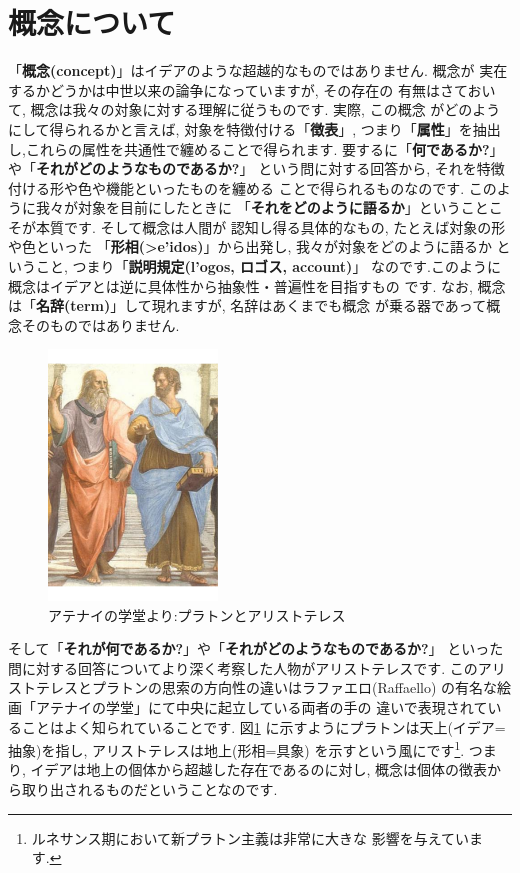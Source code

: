 \documentclass[b5j,8pt,twocolumn]{ltjsarticle}
\newcommand{\textgreek}[1]{\begingroup\fontencoding{LGR}\selectfont#1\endgroup}
\newcommand{\textgreek}[1]{\begingroup\fontencoding{LGR}\selectfont#1\endgroup}
\begin{document}
\section{概念について}


「\textbf{概念(concept)}」はイデアのような超越的なものではありません. 概念が
実在するかどうかは中世以来の論争\cite{普遍論争}になっていますが, その存在の
有無はさておいて, 概念は我々の対象に対する理解に従うものです. 実際, この概念
がどのようにして得られるかと言えば, 対象を特徴付ける「\textbf{徴表}」,
 つまり「\textbf{属性}」を抽出し,これらの属性を共通性で纏めることで得られます.
 要するに「\textbf{何であるか?}」や「\textbf{それがどのようなものであるか?}」
という問に対する回答から, それを特徴付ける形や色や機能といったものを纏める
ことで得られるものなのです. このように我々が対象を目前にしたときに
「\textbf{それをどのように語るか}」ということこそが本質です. そして概念は人間が
認知し得る具体的なもの, たとえば対象の形や色といった
「\textbf{形相(\textgreek{>e'idos})}」から出発し, 我々が対象をどのように語るか
ということ, つまり「\textbf{説明規定(\textgreek{l'ogos}, ロゴス, account)}」
なのです.このように概念はイデアとは逆に具体性から抽象性・普遍性を目指すもの
です. なお, 概念は「\textbf{名辞(term)}」して現れますが, 名辞はあくまでも概念
が乗る器であって概念そのものではありません.
\newline

\begin{figure}
\includegraphics[width=4.5cm]{Plato_and_Aristotle_in_The_School_of_Athens,_by_italian_Rafael.pdf}
\caption{アテナイの学堂より:プラトンとアリストテレス}
\label{fig:Plato-Aristotle}
\end{figure}


そして「\textbf{それが何であるか?}」や「\textbf{それがどのようなものであるか?}」
といった問に対する回答についてより深く考察した人物がアリストテレスです.
 このアリストテレスとプラトンの思索の方向性の違いはラファエロ(Raffaello)
の有名な絵画「アテナイの学堂」\cite{アテナイ}にて中央に起立している両者の手の
違いで表現されていることはよく知られていることです. 図\ref{fig:Plato-Aristotle}
に示すようにプラトンは天上(イデア=抽象)を指し, アリストテレスは地上(形相=具象)
を示すという風にです\footnote{ルネサンス期において新プラトン主義は非常に大きな
影響を与えています.}. つまり, イデアは地上の個体から超越した存在であるのに対し,
 概念は個体の徴表から取り出されるものだということなのです.
\newline
\end{document}
